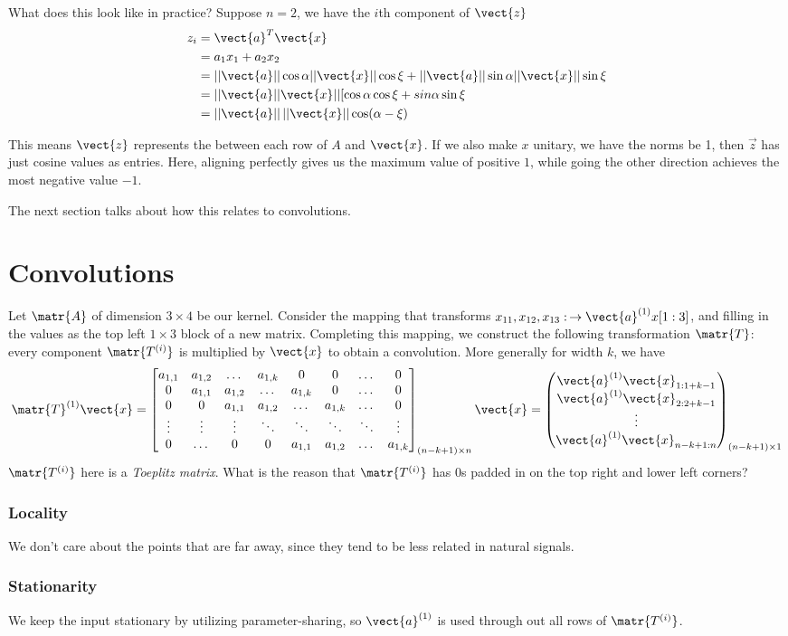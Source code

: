 What does this look like in practice?
Suppose $n=2$, we have the $i$th component of $\vect{z}$ 
\begin{align}
z_i & = \vect{a}^T\vect{x} \\
& = a_1x_1 + a_2x_2 \\
&= ||\vect{a}|| \cos \alpha ||\vect{x}|| \cos\xi + ||\vect{a}|| \sin \alpha  ||\vect{x}|| \sin\xi \\
&= ||\vect{a}||\vect{x}|| [\cos\alpha \cos\xi + sin\alpha \sin\xi \\
&=||\vect{a}||\,||\vect{x}||\cos(\alpha-\xi)
\end{align}


This means $\vect{z}$ represents the  between each row of $A$ and $\vect{x}$. If we also make $x$ unitary, we have the norms be 1, then $\vec{z}$ has just cosine values as entries. Here, aligning perfectly gives us the maximum value of positive $1$, while going the other direction achieves the most negative value $-1$.

The next section talks about how this relates to convolutions.
\section{Convolutions}
Let $\matr{A}$ of dimension $3\times 4$ be our kernel. Consider the mapping that transforms $x_{11}, x_{12}, x_{13}:\, \to \vect{a}^{(1)} x[1:3]$, and filling in the values as the top left $1\times 3$ block of a new matrix. Completing this mapping, we construct the following transformation $\matr{T}$: every component $\matr{T^{(i)}}$ is multiplied by $\vect{x}$ to obtain a convolution. More generally for width $k$, we have
\[
\matr{T}^{(1)}\vect{x} =
\begin{bmatrix}
    a_{1,1} & a_{1,2} & \dotsc & a_{1,k} & 0 & 0 & \dotsc & 0 \\
    0 & a_{1,1} & a_{1,2} & \dotsc & a_{1,k} & 0 & \dotsc & 0 \\
    0 & 0 & a_{1,1} & a_{1,2} & \dotsc & a_{1,k} & \dotsc & 0 \\
    \vdots & \vdots & \vdots & \ddots & \ddots & \ddots & \ddots & \vdots \\
    0 & \dotsc & 0 & 0 & a_{1,1} & a_{1,2} & \dotsc & a_{1,k}
\end{bmatrix}_{(n-k+1) \times n} \vect{x}=
\begin{pmatrix}
    \vect{a}^{(1)} \vect{x}_{1:1+k-1} \\ \vect{a}^{(1)} \vect{x}_{2:2+k-1} \\ \vdots \\ \vect{a}^{(1)}  \vect{x}_{n-k+1:n}
\end{pmatrix}_{(n-k+1) \times 1}
\]
$\matr{T^{(i)}}$ here is a \textit{Toeplitz matrix}. What is the reason that $\matr{T^{(i)}}$ has $0$s padded in on the top right and lower left corners?
\subsubsection{Locality}
We don't care about the points that are far away, since they tend to be less related in natural signals.

\subsubsection{Stationarity}
We keep the input stationary by utilizing parameter-sharing, so $\vect{a}^{(1)}$ is used through out all rows of $\matr{T^{(i)}}$.

